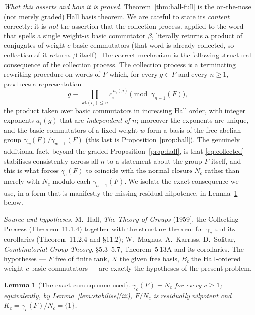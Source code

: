 \documentclass{amsart}
\newtheorem{lemma}{Lemma}
\theoremstyle{definition}
\theoremstyle{remark}
\begin{document}
\noindent
\emph{What this asserts and how it is proved.} Theorem~\ref{thm:hall-full} is the
on-the-nose (not merely graded) Hall basis theorem. We are careful to state its
\emph{content} correctly: it is \emph{not} the assertion that the collection
process, applied to the word that spells a single weight-$w$ basic commutator
$\beta$, literally returns a product of conjugates of weight-$c$ basic commutators
(that word is already collected, so collection of it returns $\beta$ itself). The
correct mechanism is the following structural consequence of the collection
process. The collection process is a terminating rewriting procedure on words of
$F$ which, for every $g\in F$ and every $n\ge1$, produces a representation
\begin{equation}\label{eq:collected}
g\equiv\prod_{\mathrm{wt}(c_i)\le n} c_i^{\,a_i(g)}\pmod{\gamma_{n+1}(F)},
\end{equation}
the product taken over basic commutators in increasing Hall order, with integer
exponents $a_i(g)$ that are \emph{independent of $n$}; moreover the exponents are
unique, and the basic commutators of a fixed weight $w$ form a basis of the free
abelian group $\gamma_w(F)/\gamma_{w+1}(F)$ (this last is
Proposition~\ref{prop:hall}). The genuinely additional fact, beyond the graded
Proposition~\ref{prop:hall}, is that \eqref{eq:collected} stabilises consistently
across all $n$ to a statement about the group $F$ itself, and this is what forces
$\gamma_c(F)$ to coincide with the normal closure $N_c$ rather than merely with
$N_c$ modulo each $\gamma_{n+1}(F)$. We isolate the exact consequence we use, in a
form that is manifestly the missing residual nilpotence, in
Lemma~\ref{lem:hall-residual} below.

\smallskip
\emph{Source and hypotheses.} M.\ Hall, \emph{The Theory of Groups} (1959), the
Collecting Process (Theorem~11.1.4) together with the structure theorem for
$\gamma_c$ and its corollaries (Theorem~11.2.4 and \S11.2); W.\ Magnus, A.\ Karrass,
D.\ Solitar, \emph{Combinatorial Group Theory}, \S5.3--5.7, Theorem~5.13A and its
corollaries. The hypotheses --- $F$ free of finite rank, $X$ the given free basis,
$B_c$ the Hall-ordered weight-$c$ basic commutators --- are exactly the hypotheses
of the present problem.

\begin{lemma}[The exact consequence used]\label{lem:hall-residual}
$\gamma_c(F)=N_c$ for every $c\ge1$; equivalently, by
Lemma~\ref{lem:stabilise}(iii), $F/N_c$ is residually nilpotent and
$K_c=\gamma_c(F)/N_c=\{1\}$.
\end{lemma}
\end{document}

